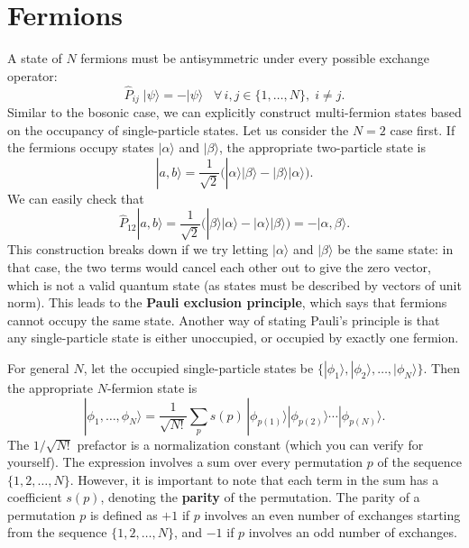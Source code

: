 \documentclass[pra,12pt]{revtex4}
\begin{document}
\section{Fermions}

A state of $N$ fermions must be antisymmetric under every possible
exchange operator:
$$\hat{P}_{ij}\; |\psi\rangle = -|\psi\rangle \;\;\; \forall\, i,j\in\{1,\dots,N\}, \; i\ne j.$$
Similar to the bosonic case, we can explicitly construct multi-fermion
states based on the occupancy of single-particle states.  Let us
consider the $N=2$ case first.  If the fermions occupy states
$|\alpha\rangle$ and $|\beta\rangle$, the appropriate two-particle
state is
$$|a,b\rangle = \frac{1}{\sqrt{2}} \Big(|\alpha\rangle|\beta\rangle - |\beta\rangle|\alpha\rangle\Big).$$
We can easily check that
$$\hat{P}_{12} |a,b\rangle = \frac{1}{\sqrt{2}} \Big(|\beta\rangle|\alpha\rangle - |\alpha\rangle|\beta\rangle\Big) = - |\alpha,\beta\rangle.$$
This construction breaks down if we try letting $|\alpha\rangle$ and
$|\beta\rangle$ be the same state: in that case, the two terms would
cancel each other out to give the zero vector, which is not a valid
quantum state (as states must be described by vectors of unit norm).
This leads to the \textbf{Pauli exclusion principle}, which says that
fermions cannot occupy the same state.  Another way of stating Pauli's
principle is that any single-particle state is either unoccupied, or
occupied by exactly one fermion.

For general $N$, let the occupied single-particle states be
$\{|\phi_1\rangle, |\phi_2\rangle,\dots,|\phi_N\rangle\}$.  Then the
appropriate $N$-fermion state is
$$|\phi_1,\dots,\phi_N\rangle = \frac{1}{\sqrt{N!}} \sum_p s(p)\, |\phi_{p(1)}\rangle |\phi_{p(2)}\rangle \cdots |\phi_{p(N)}\rangle.$$
The $1/\sqrt{N!}$ prefactor is a normalization constant (which you can
verify for yourself).  The expression involves a sum over every
permutation $p$ of the sequence $\{1,2,\dots,N\}$.  However, it is
important to note that each term in the sum has a coefficient $s(p)$,
denoting the \textbf{parity} of the permutation.  The parity of a
permutation $p$ is defined as $+1$ if $p$ involves an even number of
exchanges starting from the sequence $\{1,2,\dots,N\}$, and $-1$ if
$p$ involves an odd number of exchanges.
\end{document}
